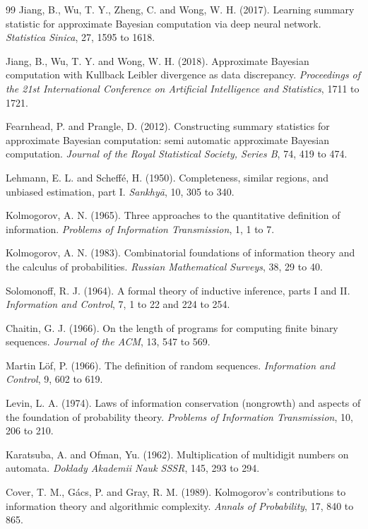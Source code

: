 \documentclass[11pt,twoside,openany]{book}
\theoremstyle{plain}
\theoremstyle{definition}
\theoremstyle{remark}
\begin{document}
\begin{thebibliography}{99}
 Jiang, B., Wu, T. Y., Zheng, C. and Wong, W. H. (2017). Learning summary statistic for approximate Bayesian computation via deep neural network. \emph{Statistica Sinica}, 27, 1595 to 1618.

 Jiang, B., Wu, T. Y. and Wong, W. H. (2018). Approximate Bayesian computation with Kullback Leibler divergence as data discrepancy. \emph{Proceedings of the 21st International Conference on Artificial Intelligence and Statistics}, 1711 to 1721.

 Fearnhead, P. and Prangle, D. (2012). Constructing summary statistics for approximate Bayesian computation: semi automatic approximate Bayesian computation. \emph{Journal of the Royal Statistical Society, Series B}, 74, 419 to 474.

 Lehmann, E. L. and Scheff\'e, H. (1950). Completeness, similar regions, and unbiased estimation, part I. \emph{Sankhy\=a}, 10, 305 to 340.

 Kolmogorov, A. N. (1965). Three approaches to the quantitative definition of information. \emph{Problems of Information Transmission}, 1, 1 to 7.

 Kolmogorov, A. N. (1983). Combinatorial foundations of information theory and the calculus of probabilities. \emph{Russian Mathematical Surveys}, 38, 29 to 40.

 Solomonoff, R. J. (1964). A formal theory of inductive inference, parts I and II. \emph{Information and Control}, 7, 1 to 22 and 224 to 254.

 Chaitin, G. J. (1966). On the length of programs for computing finite binary sequences. \emph{Journal of the ACM}, 13, 547 to 569.

 Martin L\"of, P. (1966). The definition of random sequences. \emph{Information and Control}, 9, 602 to 619.

 Levin, L. A. (1974). Laws of information conservation (nongrowth) and aspects of the foundation of probability theory. \emph{Problems of Information Transmission}, 10, 206 to 210.

 Karatsuba, A. and Ofman, Yu. (1962). Multiplication of multidigit numbers on automata. \emph{Doklady Akademii Nauk SSSR}, 145, 293 to 294.

 Cover, T. M., G\'acs, P. and Gray, R. M. (1989). Kolmogorov's contributions to information theory and algorithmic complexity. \emph{Annals of Probability}, 17, 840 to 865.


\end{thebibliography}
\end{document}
